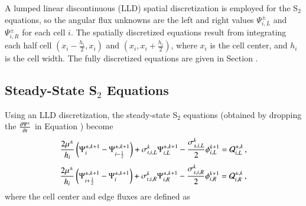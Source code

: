 \documentclass[preprint,12pt]{elsarticle}
\begin{document}
A lumped linear discontinuous (LLD) spatial discretization is employed
for the S$_2$ equations, so the angular flux
unknowns are the left and right values $\Psi_{i,L}^\pm$ and
$\Psi_{i,R}^\pm$ for each cell $i$. The spatially
discretized equations result from integrating each half cell
$(x_i-\frac{h_i}{2},x_i)$ and $(x_i,x_i+\frac{h_i}{2})$,
where $x_i$ is the cell center, and $h_i$ is the cell width.
The fully discretized equations are given in Section .

\subsection{Steady-State \texorpdfstring{S$_2$}{S-2} Equations}
Using an LLD discretization, the steady-state
S$_2$ equations (obtained by dropping the $\frac{\partial \Psi^\pm}{\partial t}$ in Equation
) become
\begin{equation}\lequ{S2ssL}
  \frac{2\mu^\pm}{h_i}\fn{\Psi^{\pm,k+1}_i - \Psi^{\pm,k+1}_{i-\half}}
  +\sigma_{t,i,L}^k\Psi\iL^{\pm,k+1}
  -\frac{\sigma_{s,i,L}^k}{2}\phi\iL^{k+1}
  =\Q_{i,L}^{\pm,k} \pec
\end{equation}
\begin{equation}\lequ{S2ssR}
  \frac{2\mu^\pm}{h_i}\fn{\Psi^{\pm,k+1}_{i+\half} - \Psi^{\pm,k+1}_i}
  +\sigma_{t,i,R}^k\Psi\iR^{\pm,k+1}
  -\frac{\sigma_{s,i,R}^k}{2}\phi\iR^{k+1}
  =\Q_{i,R}^{\pm,k} \pec
\end{equation}
where the cell center and edge fluxes are defined as
\end{document}
